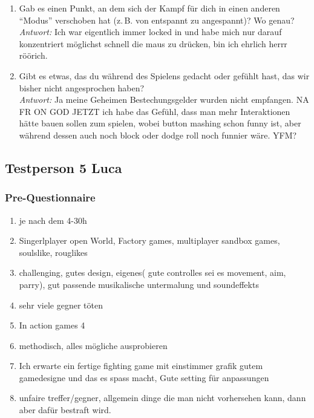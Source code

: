 \documentclass[../Main.tex]{subfiles}
\begin{document}
\begin{enumerate}[label=\textbf{I\arabic*}, leftmargin=1.5cm, itemsep=1em]
\item Gab es einen Punkt, an dem sich der Kampf für dich in einen anderen \enquote{Modus} verschoben hat (z.\,B. von entspannt zu angespannt)? Wo genau? \\
\textit{Antwort:} Ich war eigentlich immer locked in und habe mich nur darauf konzentriert möglichst schnell die maus zu drücken, bin ich ehrlich herrr röörich.

\item Gibt es etwas, das du während des Spielens gedacht oder gefühlt hast, das wir bisher nicht angesprochen haben? \\
\textit{Antwort:} Ja meine Geheimen Bestechungsgelder wurden nicht empfangen. NA FR ON GOD JETZT ich habe das Gefühl, dass man mehr Interaktionen hätte bauen sollen zum spielen, wobei button mashing schon funny ist, aber während dessen auch noch block oder dodge roll noch funnier wäre. YFM?
\end{enumerate}

\subsection{Testperson 5 Luca}

\subsubsection{Pre-Questionnaire}

\begin{enumerate}[label=\textbf{P\arabic*}, leftmargin=1.5cm, itemsep=0.5em]
\item je nach dem 4-30h
\item Singerlplayer open World, Factory games, multiplayer sandbox games, soulslike, rouglikes
\item challenging, gutes design, eigenes( gute controlles sei es movement, aim, parry), gut passende musikalische untermalung und soundeffekts
\item sehr viele gegner töten
\item In action games 4
\item methodisch, alles mögliche ausprobieren
\item Ich erwarte ein fertige fighting game mit einstimmer grafik gutem gamedesigne und das es spass macht, Gute setting für anpassungen
\item unfaire treffer/gegner, allgemein dinge die man nicht vorhersehen kann, dann aber dafür bestraft wird.
\end{enumerate}
\end{document}
